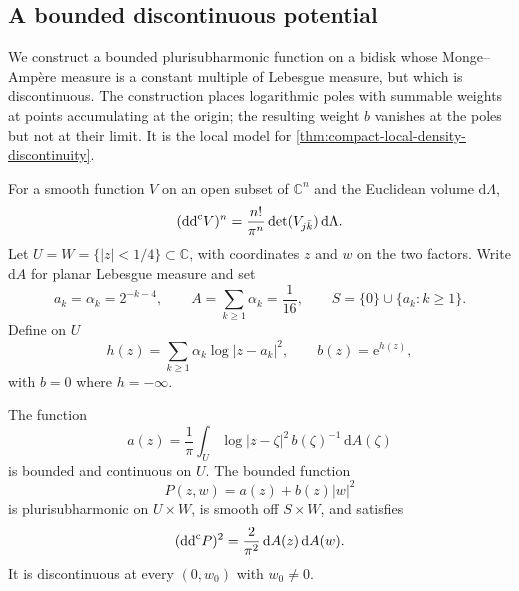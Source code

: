 \subsection{A bounded discontinuous potential}

We construct a bounded plurisubharmonic function on a bidisk whose Monge--Amp\`ere measure is a constant multiple of Lebesgue measure, but which is discontinuous. The construction places logarithmic poles with summable weights at points accumulating at the origin; the resulting weight $b$ vanishes at the poles but not at their limit. It is the local model for \cref{thm:compact-local-density-discontinuity}.

For a smooth function $V$ on an open subset of $\mathbb C^n$ and the Euclidean volume $\mathrm{d}\Lambda$,
\begin{equation}\label{eq:local-density-determinant}
 (\mathrm{dd}^{\mathrm{c}} V)^n=\frac{n!}{\pi^n}\det(V_{j\bar k})\,\mathrm{d}\Lambda.
\end{equation}
Let $U=W=\{|z|<1/4\}\subset\mathbb C$, with coordinates $z$ and $w$ on the two factors. Write $\mathrm{d}A$ for planar Lebesgue measure and set
\[
 a_k=\alpha_k=2^{-k-4},\qquad
 A=\sum_{k\geq1}\alpha_k=\frac1{16},\qquad
 S=\{0\}\cup\{a_k:k\geq1\}.
\]
Define on $U$
\begin{equation}\label{eq:accumulating-polar-weight}
 h(z)=\sum_{k\geq1}\alpha_k\log|z-a_k|^2,
 \qquad b(z)=\mathrm{e}^{h(z)},
\end{equation}
with $b=0$ where $h=-\infty$.

\begin{lemma}\label{lem:discontinuous-constant-measure}
The function
\[
 a(z)=\frac1\pi\int_U\log|z-\zeta|^2\,b(\zeta)^{-1}\,\mathrm{d}A(\zeta)
\]
is bounded and continuous on $U$. The bounded function
\[
 P(z,w)=a(z)+b(z)|w|^2
\]
is plurisubharmonic on $U\times W$, is smooth off $S\times W$, and satisfies
\begin{equation}\label{eq:discontinuous-constant-measure}
 (\mathrm{dd}^{\mathrm{c}} P)^2=\frac2{\pi^2}\,\mathrm{d}A(z)\,\mathrm{d}A(w).
\end{equation}
It is discontinuous at every $(0,w_0)$ with $w_0\ne0$.
\end{lemma}

